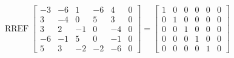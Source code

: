 \begin{exerciseAnswer} 


\[\operatorname{RREF} \left[\begin{array}{ccccc|c}
-3 & -6 & 1 & -6 & 4 & 0 \\
3 & -4 & 0 & 5 & 3 & 0 \\
3 & 2 & -1 & 0 & -4 & 0 \\
-6 & -1 & 5 & 0 & -1 & 0 \\
5 & 3 & -2 & -2 & -6 & 0
\end{array}\right] = \left[\begin{array}{ccccc|c}
1 & 0 & 0 & 0 & 0 & 0 \\
0 & 1 & 0 & 0 & 0 & 0 \\
0 & 0 & 1 & 0 & 0 & 0 \\
0 & 0 & 0 & 1 & 0 & 0 \\
0 & 0 & 0 & 0 & 1 & 0
\end{array}\right] \]



\end{exerciseAnswer}
